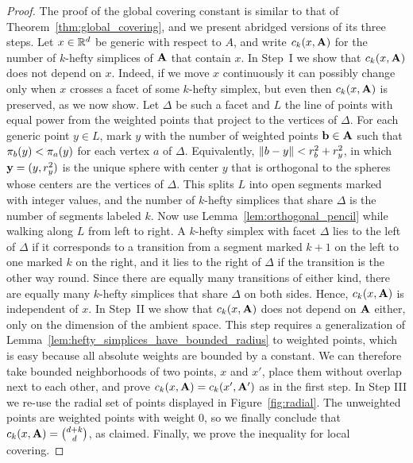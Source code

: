 \documentclass[10pt,a4paper]{article}
\newcommand {\mm}[1] {\ifmmode{#1}\else{\mbox{\(#1\)}}\fi}
\theoremstyle{plain}
\newcommand{\Rspace}        {\mm{{\mathbb R}}}
\newcommand{\AAA}           {\mm{\bf A}}
\newcommand{\bbb}           {\mm{\bf b}}
\newcommand{\yyy}           {\mm{\bf{y}}}
\newcommand{\wdist}[2]      {\mm{\pi_{#1}{({#2})}}}
\newcommand{\cover}[2]      {\mm{{c}_{#1}{({#2})}}}
\newcommand{\Edist}[2]      {\mm{\|{#1}-{#2}\|}}
\begin{document}
\begin{proof}
  The proof of the global covering constant is similar to that of Theorem~\ref{thm:global_covering}, and we present abridged versions of its three steps.
  Let $x \in \Rspace^d$ be generic with respect to $A$, and write $\cover{k}{x,\AAA}$ for the number of $k$-hefty simplices of $\AAA$ that contain $x$.
  \smallskip
  In Step~I we show that $\cover{k}{x,\AAA}$ does not depend on $x$.
  Indeed, if we move $x$ continuously it can possibly change only when $x$ crosses a facet of some $k$-hefty simplex, but even then $\cover{k}{x,\AAA}$ is preserved, as we now show.
  Let $\Delta$ be such a facet and $L$ the line of points with equal power from the weighted points that project to the vertices of $\Delta$.
  For each generic point $y \in L$, mark $y$ with the number of weighted points $\bbb \in \AAA$ such that $\wdist{b}{y} < \wdist{a}{y}$ for each vertex $a$ of $\Delta$.
  Equivalently, $\Edist{b}{y} < r_b^2 + r_y^2$, in which $\yyy = (y, r_y^2)$ is the unique sphere with center $y$ that is orthogonal to the spheres whose centers are the vertices of $\Delta$.
  This splits $L$ into open segments marked with integer values, and the number of $k$-hefty simplices that share $\Delta$ is the number of segments labeled $k$.
  Now use Lemma~\ref{lem:orthogonal_pencil} while walking along $L$ from left to right.
  A $k$-hefty simplex with facet $\Delta$ lies to the left of $\Delta$ if it corresponds to a transition from a segment marked $k+1$ on the left to one marked $k$ on the right, and it lies to the right of $\Delta$ if the transition is the other way round.
  Since there are equally many transitions of either kind, there are equally many $k$-hefty simplices that share $\Delta$ on both sides.
  Hence, $\cover{k}{x,\AAA}$ is independent of $x$.
  \smallskip
  In Step~II we show that $\cover{k}{x,\AAA}$ does not depend on $\AAA$ either, only on the dimension of the ambient space.
  This step requires a generalization of Lemma~\ref{lem:hefty_simplices_have_bounded_radius} to weighted points, which is easy because all absolute weights are bounded by a constant.
  We can therefore take bounded neighborhoods of two points, $x$ and $x'$, place them without overlap next to each other, and prove $\cover{k}{x,\AAA} = \cover{k}{x',\AAA'}$ as in the first step.
  In Step III we re-use the radial set of points displayed in Figure~\ref{fig:radial}.
  The unweighted points are weighted points with weight $0$, so we finally conclude that $\cover{k}{x,\AAA} = \binom{d+k}{d}$, as claimed.
  \smallskip
  Finally, we prove the inequality for local covering.

\end{proof}
\end{document}
